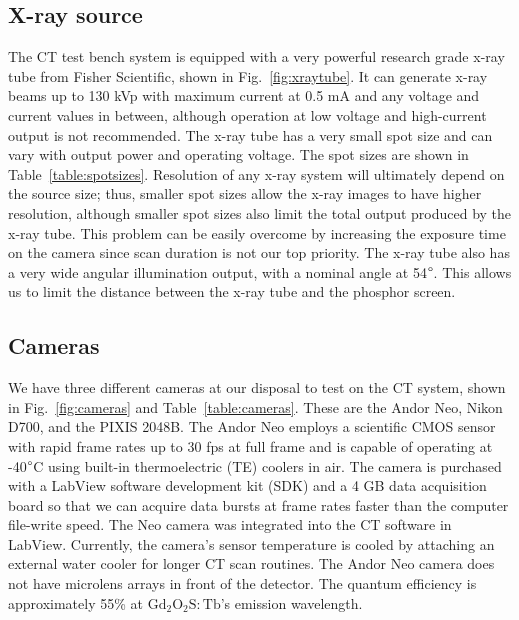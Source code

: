 \subsection{X-ray source}
The CT test bench system is equipped with a very powerful research grade x-ray tube from Fisher Scientific, shown in Fig.~\ref{fig:xraytube}.  It can generate x-ray beams up to 130 kVp with maximum current at 0.5 mA and any voltage and current values in between, although operation at low voltage and high-current output is not recommended.  The x-ray tube has a very small spot size and can vary with output power and operating voltage.  The spot sizes are shown in Table~\ref{table:spotsizes}.  Resolution of any x-ray system will ultimately depend on the source size; thus, smaller spot sizes allow the x-ray images to have higher resolution, although smaller spot sizes also limit the total output produced by the x-ray tube.  This problem can be easily overcome by increasing the exposure time on the camera since scan duration is not our top priority.  The x-ray tube also has a very wide angular illumination output, with a nominal angle at 54$\degree$.  This allows us to limit the distance between the x-ray tube and the phosphor screen.
%
\begin{figure}
\begin{floatrow}
\end{floatrow}
\end{figure}

\subsection{Cameras}
We have three different cameras at our disposal to test on the CT system, shown in Fig.~\ref{fig:cameras} and Table~\ref{table:cameras}.  These are the Andor Neo, Nikon D700, and the PIXIS 2048B.  The Andor Neo employs a scientific CMOS sensor with rapid frame rates up to 30 fps at full frame and is capable of operating at -40$\degree$C using built-in thermoelectric (TE) coolers in air.  The camera is purchased with a LabView software development kit (SDK) and a 4 GB data acquisition board so that we can acquire data bursts at frame rates faster than the computer file-write speed.  The Neo camera was integrated into the CT software in LabView.  Currently, the camera's sensor temperature is cooled by attaching an external water cooler for longer CT scan routines.  The Andor Neo camera does not have microlens arrays in front of the detector.  The quantum efficiency is approximately 55\% at $\mathrm{Gd_2O_2S:Tb}$'s emission wavelength.

